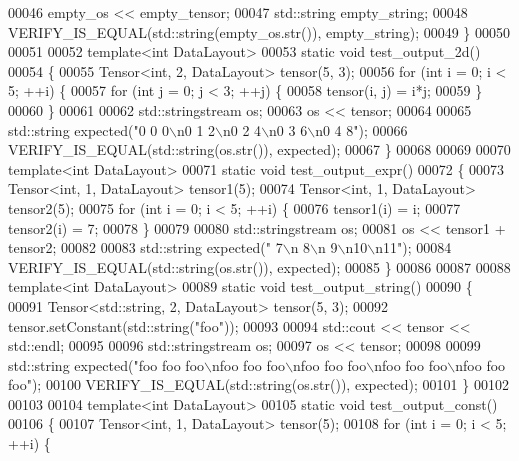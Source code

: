 \begin{DoxyCode}
00046   empty\_os << empty\_tensor;
00047   std::string empty\_string;
00048   VERIFY\_IS\_EQUAL(std::string(empty\_os.str()), empty\_string);
00049 \}
00050 
00051 
00052 \textcolor{keyword}{template}<\textcolor{keywordtype}{int} DataLayout>
00053 \textcolor{keyword}{static} \textcolor{keywordtype}{void} test\_output\_2d()
00054 \{
00055   Tensor<int, 2, DataLayout> tensor(5, 3);
00056   \textcolor{keywordflow}{for} (\textcolor{keywordtype}{int} i = 0; i < 5; ++i) \{
00057     \textcolor{keywordflow}{for} (\textcolor{keywordtype}{int} j = 0; j < 3; ++j) \{
00058       tensor(i, j) = i*j;
00059     \}
00060   \}
00061 
00062   std::stringstream os;
00063   os << tensor;
00064 
00065   std::string expected(\textcolor{stringliteral}{"0  0  0\(\backslash\)n0  1  2\(\backslash\)n0  2  4\(\backslash\)n0  3  6\(\backslash\)n0  4  8"});
00066   VERIFY\_IS\_EQUAL(std::string(os.str()), expected);
00067 \}
00068 
00069 
00070 \textcolor{keyword}{template}<\textcolor{keywordtype}{int} DataLayout>
00071 \textcolor{keyword}{static} \textcolor{keywordtype}{void} test\_output\_expr()
00072 \{
00073   Tensor<int, 1, DataLayout> tensor1(5);
00074   Tensor<int, 1, DataLayout> tensor2(5);
00075   \textcolor{keywordflow}{for} (\textcolor{keywordtype}{int} i = 0; i < 5; ++i) \{
00076     tensor1(i) = i;
00077     tensor2(i) = 7;
00078   \}
00079 
00080   std::stringstream os;
00081   os << tensor1 + tensor2;
00082 
00083   std::string expected(\textcolor{stringliteral}{" 7\(\backslash\)n 8\(\backslash\)n 9\(\backslash\)n10\(\backslash\)n11"});
00084   VERIFY\_IS\_EQUAL(std::string(os.str()), expected);
00085 \}
00086 
00087 
00088 \textcolor{keyword}{template}<\textcolor{keywordtype}{int} DataLayout>
00089 \textcolor{keyword}{static} \textcolor{keywordtype}{void} test\_output\_string()
00090 \{
00091   Tensor<std::string, 2, DataLayout> tensor(5, 3);
00092   tensor.setConstant(std::string(\textcolor{stringliteral}{"foo"}));
00093 
00094   std::cout << tensor << std::endl;
00095 
00096   std::stringstream os;
00097   os << tensor;
00098 
00099   std::string expected(\textcolor{stringliteral}{"foo  foo  foo\(\backslash\)nfoo  foo  foo\(\backslash\)nfoo  foo  foo\(\backslash\)nfoo  foo  foo\(\backslash\)nfoo  foo  foo"});
00100   VERIFY\_IS\_EQUAL(std::string(os.str()), expected);
00101 \}
00102 
00103 
00104 \textcolor{keyword}{template}<\textcolor{keywordtype}{int} DataLayout>
00105 \textcolor{keyword}{static} \textcolor{keywordtype}{void} test\_output\_const()
00106 \{
00107   Tensor<int, 1, DataLayout> tensor(5);
00108   \textcolor{keywordflow}{for} (\textcolor{keywordtype}{int} i = 0; i < 5; ++i) \{

\end{DoxyCode}
